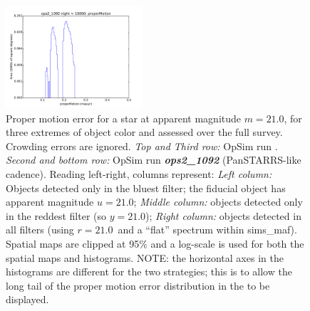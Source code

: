 \begin{figure}[ht]
\begin{center}
  \includegraphics[width=2.0in]{./figs/milkyway/MW_Astrom_pmError_1092_10y_hst.pdf}
  \end{center}
  \caption{Proper motion error for a star at apparent magnitude $m=21.0$, for three extremes of object color and assessed over the full survey. Crowding errors are ignored. {\it Top and Third row:} OpSim run . {\it Second and bottom row:} OpSim run {\it \bf ops2\_1092} (PanSTARRS-like cadence). Reading left-right, columns represent: {\it Left column:} Objects detected only in the bluest filter; the fiducial object has apparent magnitude $u=21.0$; {\it Middle column:} objects detected only in the reddest filter (so $y = 21.0$); {\it Right column:} objects detected in all filters (using $r=21.0$~and a ``flat'' spectrum within sims\_maf). Spatial maps are clipped at 95\% and a log-scale is used for both the spatial maps and histograms. NOTE: the horizontal axes in the histograms are different for the two strategies; this is to allow the long tail of the proper motion error distribution in the  to be displayed.}
  \label{fig_astrom_ByFilter_pmError}
\end{figure}

